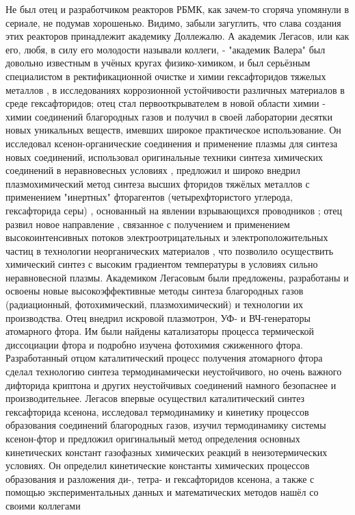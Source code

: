 Не был отец и разработчиком реакторов РБМК, как зачем-то сгоряча упомянули в
сериале, не подумав хорошенько. Видимо, забыли загуглить, что слава создания
этих реакторов принадлежит академику Доллежалю. А академик Легасов, или как
его, любя, в силу его молодости называли коллеги, -  "академик Валера" был
довольно известным в учёных кругах физико-химиком, и был серьёзным специалистом
в ректификационной очистке и химии гексафторидов тяжелых металлов , в
исследованиях коррозионной устойчивости различных материалов в среде
гексафторидов; отец стал первооткрывателем в новой области химии - химии
соединений благородных газов и получил в своей лаборатории десятки новых
уникальных веществ, имевших широкое практическое использование. Он исследовал
ксенон-органические соединения и применение плазмы для синтеза новых
соединений, использовал оригинальные техники синтеза химических соединений в
неравновесных условиях , предложил и широко внедрил плазмохимический метод
синтеза высших фторидов тяжёлых металлов с применением "инертных" фторагентов
(четырехфтористого углерода, гексафторида серы) , основанный на явлении
взрывающихся проводников ; отец развил новое направление , связанное с
получением и применением высокоинтенсивных потоков электроотрицательных и
электроположительных частиц в технологии неорганических материалов , что
позволило осуществить химический синтез с высоким градиентом температуры в
условиях сильно неравновесной плазмы. Академиком Легасовым были предложены,
разработаны и освоены новые высокоэффективные методы синтеза благородных газов
(радиационный, фотохимический, плазмохимический) и технологии их производства.
Отец внедрил искровой плазмотрон, УФ- и ВЧ-генераторы атомарного фтора. Им были
найдены катализаторы процесса термической диссоциации фтора и подробно изучена
фотохимия сжиженного фтора. Разработанный отцом каталитический процесс
получения атомарного фтора сделал технологию синтеза термодинамически
неустойчивого, но очень важного дифторида криптона и других неустойчивых
соединений намного безопаснее и производительнее. Легасов впервые осуществил
каталитический синтез гексафторида ксенона, исследовал термодинамику и кинетику
процессов образования соединений благородных газов, изучил термодинамику
системы ксенон-фтор и предложил оригинальный метод определения основных
кинетических констант газофазных химических реакций в неизотермических
условиях. Он определил кинетические константы химических процессов образования
и разложения ди-, тетра- и гексафторидов ксенона, а также с помощью
экспериментальных данных и математических методов нашёл со своими коллегами
